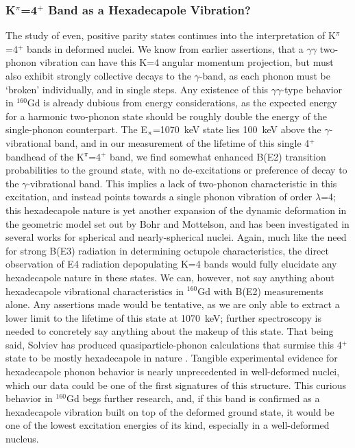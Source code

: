 \subsubsection{K$^\pi$=4$^+$ Band as a Hexadecapole Vibration?}
The study of even, positive parity states continues into the interpretation of K$^\pi$=4$^+$ bands in deformed nuclei. We know from earlier assertions, that a $\gamma\gamma$ two-phonon vibration can have this K=4 angular momentum projection, but must also exhibit strongly collective decays to the $\gamma$-band, as each phonon must be `broken' individually, and in single steps. Any existence of this $\gamma\gamma$-type behavior in $^{160}$Gd is already dubious from energy considerations, as the expected energy for a harmonic two-phonon state should be roughly double the energy of the single-phonon counterpart. The E$_{\rm x}$=1070~keV state lies 100~keV above the $\gamma$-vibrational band, and in our measurement of the lifetime of this single 4$^+$ bandhead of the K$^\pi$=4$^+$ band, we find somewhat enhanced B(E2) transition probabilities to the ground state, with no de-excitations or preference of decay to the $\gamma$-vibrational band. This implies a lack of two-phonon characteristic in this excitation, and instead points towards a single phonon vibration of order $\lambda$=4; this hexadecapole nature is yet another expansion of the dynamic deformation in the geometric model set out by Bohr and Mottelson, and has been investigated in several works \cite{Burke_hexadecapole1994,Soloviev_QuadHex,Garrett_OctHex} for spherical and nearly-spherical nuclei. Again, much like the need for strong B(E3) radiation in determining octupole characteristics, the direct observation of E4 radiation depopulating K=4 bands would fully elucidate any hexadecapole nature in these states. We can, however, not say anything about hexadecapole vibrational characteristics in $^{160}$Gd with B(E2) measurements alone. Any assertions made would be tentative, as we are only able to extract a lower limit to the lifetime of this state at 1070~keV; further spectroscopy is needed to concretely say anything about the makeup of this state. That being said, Solviev has produced quasiparticle-phonon calculations that surmise this 4$^+$ state to be mostly hexadecapole in nature \cite{Soloviev_QuadHex}. Tangible experimental evidence for hexadecapole phonon behavior is nearly unprecedented in well-deformed nuclei, which our data could be one of the first signatures of this structure. This curious behavior in $^{160}$Gd begs further research, and, if this band is confirmed as a hexadecapole vibration built on top of the deformed ground state, it would be one of the lowest excitation energies of its kind, especially in a well-deformed nucleus.

